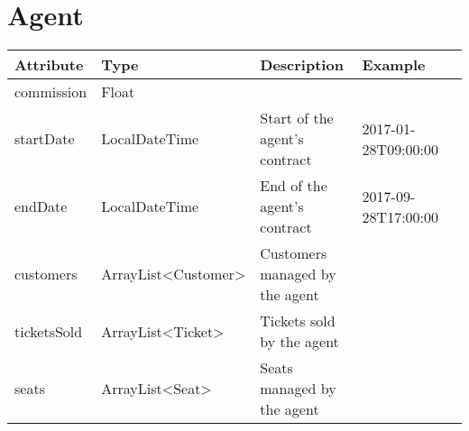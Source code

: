 \section{Agent}
\keepXColumns
\begin{tabularx}{\linewidth}{l l l X l}
  \textbf{Attribute}&\textbf{Type}&\textbf{Description}&\textbf{Example}\\
  \endhead
  commission  & Float               &&\\
  startDate   & LocalDateTime       & Start of the agent's contract   & 2017-01-28T09:00:00\\
  endDate     & LocalDateTime       & End of the agent's contract     & 2017-09-28T17:00:00\\
  customers   & ArrayList<Customer> & Customers managed by the agent  &\\
  ticketsSold & ArrayList<Ticket>   & Tickets sold by the agent       &\\
  seats       & ArrayList<Seat>     & Seats managed by the agent      &
\end{tabularx}
